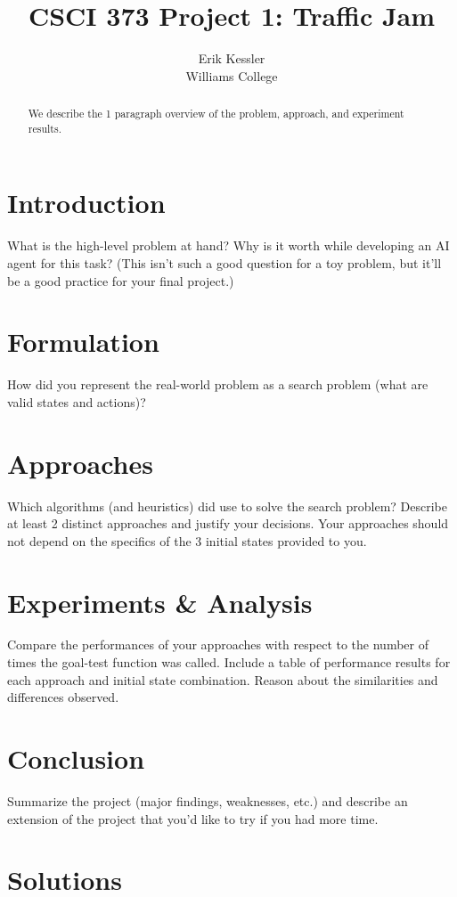 \documentclass[letterpaper,11pt,twocolumn]{article}
\begin{document}
\title{CSCI 373 Project 1: Traffic Jam} 
\date{}
\author{
  {\rm Erik Kessler}\\
       Williams College\\
}

\maketitle

\thispagestyle{empty}
                                   
\begin{abstract}
We describe the 1 paragraph overview of the problem, approach, and experiment results.
\end{abstract}

\section{Introduction}
What is the high-level problem at hand? Why is it worth while developing an AI
agent for this task? (This isn’t such a good question for a toy problem, but it’ll be a good practice
for your final project.)

\section{Formulation}
How did you represent the real-world problem as a search problem (what are valid
states and actions)?

\section{Approaches}
Which algorithms (and heuristics) did use to solve the search problem? Describe at
least 2 distinct approaches and justify your decisions. Your approaches should not depend on the
specifics of the 3 initial states provided to you.

\section{Experiments \& Analysis}
Compare the performances of your approaches with respect to the
number of times the goal-test function was called. Include a table of performance results for each
approach and initial state combination. Reason about the similarities and differences observed.

\section{Conclusion}
Summarize the project (major findings, weaknesses, etc.) and describe an extension
of the project that you’d like to try if you had more time.

\appendix
\section{Solutions}

%
%
\end{document}
